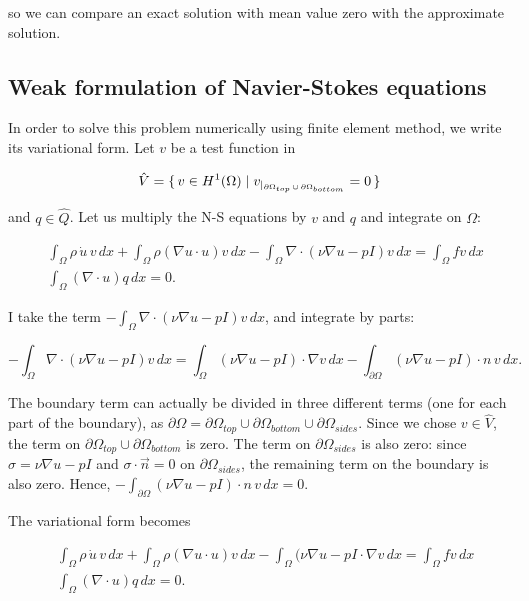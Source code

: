 \documentclass[11pt,a4paper,titlepage]{report}
\begin{document}
so we can compare an exact solution with mean value zero with the approximate solution. 

\subsection{Weak formulation of Navier-Stokes equations}


In order to solve this problem numerically using finite element method, we write its variational form. Let $v$ be a test function in

\[
\hat{V} = \set{v \in H^1(\Omega) | v_{|_{\partial \Omega_{top} \, \cup \, \partial \Omega_{bottom}}} = 0}
\]

and $q \in \hat{Q}$. Let us multiply the N-S equations by $v$ and $q$ and integrate on $\Omega$:

\begin{align}
&\int_{\Omega} \rho \, \dot{u} \, v \, dx + \int_{\Omega} \rho (\nabla u \cdot u)v \, dx - \int_{\Omega} \nabla \cdot (\nu \nabla u - pI)v \, dx = \int_{\Omega} fv \, dx \\
&\int_{\Omega} (\nabla \cdot u) q \, dx = 0.
\end{align}

I take the term $- \int_{\Omega} \nabla \cdot (\nu \nabla u - pI)v \, dx$, and integrate by parts:

\[
- \int_{\Omega} \nabla \cdot (\nu \nabla u - pI)v \, dx = \int_{\Omega} (\nu \nabla u - pI) \cdot \nabla v \, dx - \int_{\partial \Omega} (\nu \nabla u - pI) \cdot n \, v \, dx.
\]

The boundary term can actually be divided in three different terms (one for each part of the boundary), as $\partial \Omega = \partial \Omega_{top} \cup \partial \Omega_{bottom} \cup \partial \Omega_{sides}$. Since we chose $v \in \hat{V}$, the term on $\partial \Omega_{top} \cup \partial \Omega_{bottom}$ is zero. The term on $\partial \Omega_{sides}$ is also zero: since $\sigma = \nu \nabla u - pI$ and $\sigma \cdot \vec{n} = 0$ on $\partial \Omega_{sides}$, the remaining term on the boundary is also zero. Hence, $- \int_{\partial \Omega} (\nu \nabla u - pI) \cdot n \, v \, dx = 0$.

The variational form becomes

\begin{align}
& \int_{\Omega} \rho \, \dot{u} \, v \, dx + \int_{\Omega} \rho (\nabla u \cdot u)v \, dx - \int_{\Omega} (\nu \nabla u - pI \cdot \nabla v \, dx = \int_{\Omega} fv \, dx \\
& \int_{\Omega} (\nabla \cdot u) q \, dx = 0.
\end{align}
\end{document}
